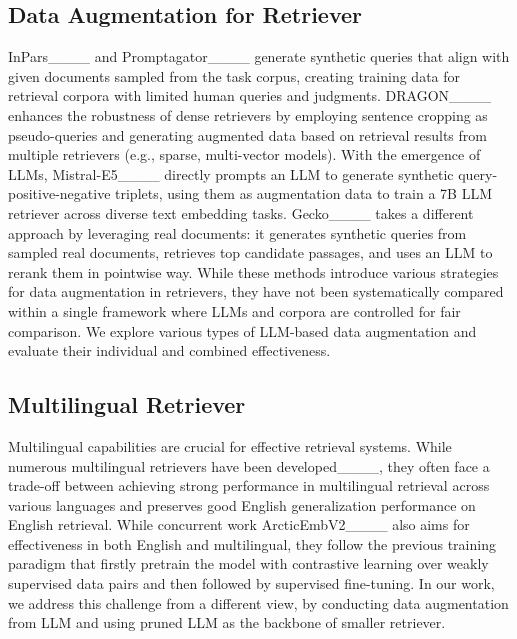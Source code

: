 \subsection{Data Augmentation for Retriever}
InPars____ and Promptagator____ generate synthetic queries that align with given documents sampled from the task corpus, creating training data for retrieval corpora with limited human queries and judgments.
DRAGON____ enhances the robustness of dense retrievers by employing sentence cropping as pseudo-queries and generating augmented data based on retrieval results from multiple retrievers (e.g., sparse, multi-vector models).
With the emergence of LLMs, Mistral-E5____ directly prompts an LLM to generate synthetic query-positive-negative triplets, using them as augmentation data to train a 7B LLM retriever across diverse text embedding tasks.
Gecko____ takes a different approach by leveraging real documents: it generates synthetic queries from sampled real documents, retrieves top candidate passages, and uses an LLM to rerank them in pointwise way.
While these methods introduce various strategies for data augmentation in retrievers, they have not been systematically compared within a single framework where LLMs and corpora are controlled for fair comparison.
We explore various types of LLM-based data augmentation and evaluate their individual and combined effectiveness.

\subsection{Multilingual Retriever}
Multilingual capabilities are crucial for effective retrieval systems.
While numerous multilingual retrievers have been developed____, they often face a trade-off between achieving strong performance in multilingual retrieval across various languages and preserves good English generalization performance on English retrieval.
While concurrent work ArcticEmbV2____ also aims for effectiveness in both English and multilingual, they follow the previous training paradigm that firstly pretrain the model with contrastive learning over weakly supervised data pairs and then followed by supervised fine-tuning.
In our work, we address this challenge from a different view, by conducting data augmentation from LLM and using pruned LLM as the backbone of smaller retriever.